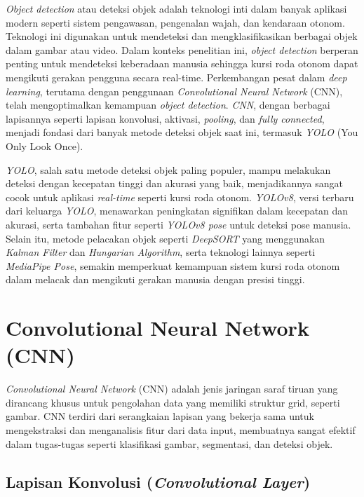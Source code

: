 \emph{Object detection} atau deteksi objek adalah teknologi inti dalam banyak aplikasi modern seperti sistem pengawasan, pengenalan wajah, dan kendaraan otonom. Teknologi ini digunakan untuk mendeteksi dan mengklasifikasikan berbagai objek dalam gambar atau video. Dalam konteks penelitian ini, \emph{object detection} berperan penting untuk mendeteksi keberadaan manusia sehingga kursi roda otonom dapat mengikuti gerakan pengguna secara real-time. Perkembangan pesat dalam \emph{deep learning}, terutama dengan penggunaan \emph{Convolutional Neural Network} (CNN), telah mengoptimalkan kemampuan \emph{object detection}. \emph{CNN}, dengan berbagai lapisannya seperti lapisan konvolusi, aktivasi, \emph{pooling}, dan \emph{fully connected}, menjadi fondasi dari banyak metode deteksi objek saat ini, termasuk \emph{YOLO} (You Only Look Once).

\emph{YOLO}, salah satu metode deteksi objek paling populer, mampu melakukan deteksi dengan kecepatan tinggi dan akurasi yang baik, menjadikannya sangat cocok untuk aplikasi \emph{real-time} seperti kursi roda otonom. \emph{YOLOv8}, versi terbaru dari keluarga \emph{YOLO}, menawarkan peningkatan signifikan dalam kecepatan dan akurasi, serta tambahan fitur seperti \emph{YOLOv8 pose} untuk deteksi pose manusia. Selain itu, metode pelacakan objek seperti \emph{DeepSORT} yang menggunakan \emph{Kalman Filter} dan \emph{Hungarian Algorithm}, serta teknologi lainnya seperti \emph{MediaPipe Pose}, semakin memperkuat kemampuan sistem kursi roda otonom dalam melacak dan mengikuti gerakan manusia dengan presisi tinggi.

\section{Convolutional Neural Network (CNN)}
\label{sec:cnn}

\emph{Convolutional Neural Network} (CNN) adalah jenis jaringan saraf tiruan yang dirancang khusus untuk pengolahan data yang memiliki struktur grid, seperti gambar. CNN terdiri dari serangkaian lapisan yang bekerja sama untuk mengekstraksi dan menganalisis fitur dari data input, membuatnya sangat efektif dalam tugas-tugas seperti klasifikasi gambar, segmentasi, dan deteksi objek.

\subsection{Lapisan Konvolusi (\emph{Convolutional Layer})}
\label{subsec:Convolutional Layer}


